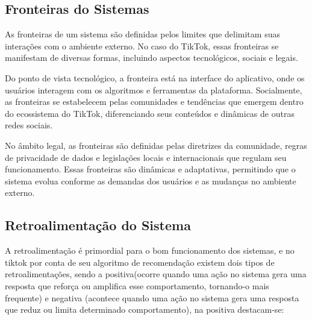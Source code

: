 \newpage
\subsection{Fronteiras do Sistemas}

As fronteiras de um sistema são definidas pelos limites que delimitam suas interações com o ambiente externo. No caso do TikTok, essas fronteiras se manifestam de diversas formas, incluindo aspectos tecnológicos, sociais e legais. \vskip0.3cm

Do ponto de vista tecnológico, a fronteira está na interface do aplicativo, onde os usuários interagem com os algoritmos e ferramentas da plataforma. Socialmente, as fronteiras se estabelecem pelas comunidades e tendências que emergem dentro do ecossistema do TikTok, diferenciando seus conteúdos e dinâmicas de outras redes sociais.\vskip0.3cm

No âmbito legal, as fronteiras são definidas pelas diretrizes da comunidade, regras de privacidade de dados e legislações locais e internacionais que regulam seu funcionamento. Essas fronteiras são dinâmicas e adaptativas, permitindo que o sistema evolua conforme as demandas dos usuários e as mudanças no ambiente externo.




\subsection{Retroalimentação do Sistema}

A  retroalimentação é primordial para o bom funcionamento dos sistemas, e no tiktok  por conta de seu algoritmo de recomendação existem dois tipos de retroalimentações, sendo a positiva(ocorre quando uma ação no sistema gera uma resposta que reforça ou amplifica esse comportamento, tornando-o mais frequente) e negativa (acontece quando uma ação no sistema gera uma resposta que reduz ou limita determinado comportamento), na positiva destacam-se:

